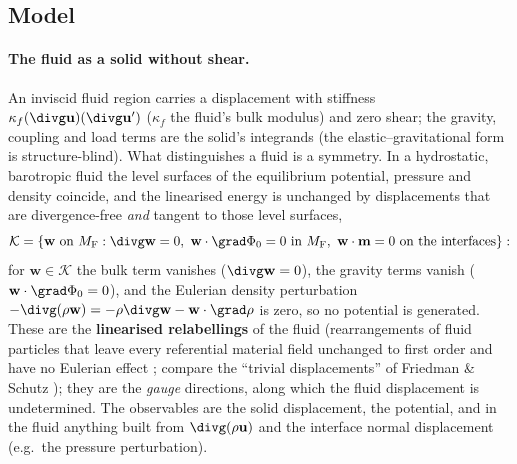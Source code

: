 \documentclass[11pt]{article}
\numberwithin{equation}{section}
\theoremstyle{remark}
\newcommand{\vu}{\mathbf{u}}
\newcommand{\vw}{\mathbf{w}}
\newcommand{\vm}{\mathbf{m}}
\newcommand{\MF}{M_{\mathrm{F}}}
\begin{document}
\subsection{Model}

\paragraph{The fluid as a solid without shear.} An inviscid fluid region
carries a displacement with stiffness $\kappa_f(\divg\vu)(\divg\vu')$
($\kappa_f$ the fluid's bulk modulus) and zero shear; the gravity, coupling
and load terms are the solid's integrands (the elastic--gravitational form
is structure-blind). What distinguishes a fluid is a symmetry. In a
hydrostatic, barotropic fluid the level surfaces of the equilibrium
potential, pressure and density coincide, and the linearised energy is
unchanged by displacements that are divergence-free \emph{and} tangent to
those level surfaces,
\begin{equation}
  \mathcal{K} = \{\vw \text{ on } \MF : \divg\vw = 0,\
               \vw\cdot\grad\Phi_0 = 0 \text{ in } \MF,\
               \vw\cdot\vm = 0 \text{ on the interfaces}\}:
  \label{eq:relabelK}
\end{equation}
for $\vw\in\mathcal{K}$ the bulk term vanishes ($\divg\vw = 0$), the
gravity terms vanish ($\vw\cdot\grad\Phi_0 = 0$), and the Eulerian density
perturbation $-\divg(\rho\vw) = -\rho\divg\vw - \vw\cdot\grad\rho$ is zero,
so no potential is generated. These are the \textbf{linearised
relabellings} of the fluid (rearrangements of fluid particles that leave
every referential material field unchanged to first order and have no
Eulerian effect \cite{AlAttarCrawford2016}; compare the ``trivial
displacements'' of Friedman \& Schutz \cite{FriedmanSchutz1978}); they are
the \emph{gauge} directions, along which the fluid displacement is
undetermined. The observables are the solid displacement, the potential,
and in the fluid anything built from $\divg(\rho\vu)$ and the interface
normal displacement (e.g.\ the pressure perturbation).
\end{document}

